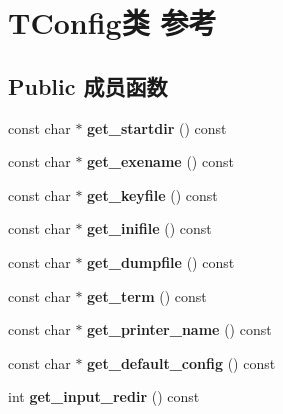 \hypertarget{class_t_config}{}\section{T\+Config类 参考}
\label{class_t_config}
\subsection*{Public 成员函数}
\begin{DoxyCompactItemize}
\item 
\mbox{\label{class_t_config_acd092736cb2a29f2537d6c41ec872c4c}} 
const char $\ast$ {\bfseries get\+\_\+startdir} () const
\item 
\mbox{\label{class_t_config_aa565292ced4fa5d1ef0322a5bf4e21f3}} 
const char $\ast$ {\bfseries get\+\_\+exename} () const
\item 
\mbox{\label{class_t_config_a921c269f04fe4364677b6b46437e4085}} 
const char $\ast$ {\bfseries get\+\_\+keyfile} () const
\item 
\mbox{\label{class_t_config_a12d845b9f84a83d8031a616064b438f9}} 
const char $\ast$ {\bfseries get\+\_\+inifile} () const
\item 
\mbox{\label{class_t_config_ae686538d7b1b7691707c53d8250dcc07}} 
const char $\ast$ {\bfseries get\+\_\+dumpfile} () const
\item 
\mbox{\label{class_t_config_a37ec56c09627db5be04654349ddf6da3}} 
const char $\ast$ {\bfseries get\+\_\+term} () const
\item 
\mbox{\label{class_t_config_a4f52b743ab8c696525e66b8989e7847a}} 
const char $\ast$ {\bfseries get\+\_\+printer\+\_\+name} () const
\item 
\mbox{\label{class_t_config_ab74da6705d8ad46bf764d65105fd8701}} 
const char $\ast$ {\bfseries get\+\_\+default\+\_\+config} () const
\item 
\mbox{\label{class_t_config_a51cb1fe8a3432fa603f5585c0a51bd4e}} 
int {\bfseries get\+\_\+input\+\_\+redir} () const

\end{DoxyCompactItemize}
